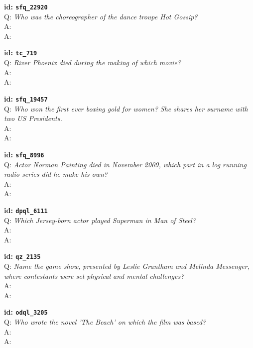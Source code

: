 \tiny{\setlength{\parindent}{0cm}
\textbf{id: \texttt{sfq\_22920}} \\
Q: \textit{Who was the choreographer of the dance troupe Hot Gossip?} \\
A:  \\
A: }

\tiny{\setlength{\parindent}{0cm}
\textbf{id: \texttt{tc\_719}} \\
Q: \textit{River Phoenix died during the making of which movie?} \\
A:  \\
A: }

\tiny{\setlength{\parindent}{0cm}
\textbf{id: \texttt{sfq\_19457}} \\
Q: \textit{Who won the first ever boxing gold for women? She shares her surname with two US Presidents.} \\
A:  \\
A: }

\tiny{\setlength{\parindent}{0cm}
\textbf{id: \texttt{sfq\_8996}} \\
Q: \textit{Actor Norman Painting died in November 2009, which part in a log running radio series did he make his own?} \\
A:  \\
A: }

\tiny{\setlength{\parindent}{0cm}
\textbf{id: \texttt{dpql\_6111}} \\
Q: \textit{Which Jersey-born actor played Superman in Man of Steel?} \\
A:  \\
A: }

\tiny{\setlength{\parindent}{0cm}
\textbf{id: \texttt{qz\_2135}} \\
Q: \textit{Name the game show, presented by Leslie Grantham and Melinda Messenger, where contestants were set physical and mental challenges?} \\
A:  \\
A: }

\tiny{\setlength{\parindent}{0cm}
\textbf{id: \texttt{odql\_3205}} \\
Q: \textit{Who wrote the novel 'The Beach' on which the film was based?} \\
A:  \\
A: }

